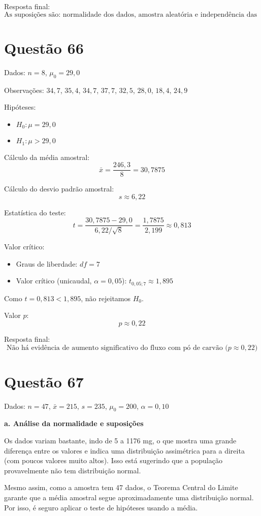 \documentclass[12pt]{article}
\newcommand{\quest}[1]{\section*{Questão #1}} %
\begin{document}
Resposta final:
\[
\boxed{\text{As suposições são: normalidade dos dados, amostra aleatória e independência das observações}}
\]

\quest{66}

Dados: $n = 8$, $\mu_0 = 29{,}0$

Observações: $34{,}7$, $35{,}4$, $34{,}7$, $37{,}7$, $32{,}5$, $28{,}0$, $18{,}4$, $24{,}9$

Hipóteses:
\begin{itemize}
  \item $H_0: \mu = 29{,}0$
  \item $H_1: \mu > 29{,}0$
\end{itemize}

Cálculo da média amostral:
\[
\bar{x} = \frac{246{,}3}{8} = 30{,}7875
\]

Cálculo do desvio padrão amostral:
\[
s \approx 6{,}22
\]

Estatística do teste:
\[
t = \frac{30{,}7875 - 29{,}0}{6{,}22 / \sqrt{8}} = \frac{1{,}7875}{2{,}199} \approx 0{,}813
\]

Valor crítico:
\begin{itemize}
  \item Graus de liberdade: $df = 7$
  \item Valor crítico (unicaudal, $\alpha = 0{,}05$): $t_{0{,}05; 7} \approx 1{,}895$
\end{itemize}

Como $t = 0{,}813 < 1{,}895$, não rejeitamos $H_0$.

Valor $p$:
\[
p \approx 0{,}22
\]

Resposta final:
\[
\boxed{\text{Não há evidência de aumento significativo do fluxo com pó de carvão ($p \approx 0{,}22$)}}
\]

\quest{67}

Dados: $n = 47$, $\bar{x} = 215$, $s = 235$, $\mu_0 = 200$, $\alpha = 0{,}10$

\textbf{a. Análise da normalidade e suposições}

Os dados variam bastante, indo de 5 a 1176 mg, o que mostra uma grande diferença entre os valores e indica uma distribuição assimétrica para a direita (com poucos valores muito altos). Isso está sugerindo que a população provavelmente não tem distribuição normal.

Mesmo assim, como a amostra tem 47 dados, o Teorema Central do Limite garante que a média amostral segue aproximadamente uma distribuição normal. Por isso, é seguro aplicar o teste de hipóteses usando a média.
\end{document}
